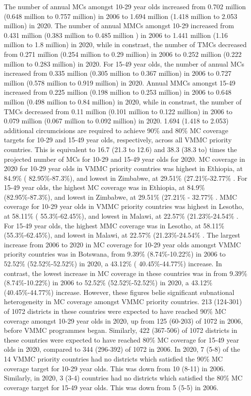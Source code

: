 \documentclass{article}
\begin{document}
The number of annual MCs amongst 10-29 year olds increased from 0.702 million (0.648 million to 0.757
million) in 2006 to 1.694 million (1.418 million to 2.053 million) in 2020.
The number of annual MMCs amongst 10-29 increased from 0.431 million (0.383 million to 0.485 million
) in 2006 to 1.441 million (1.16 million to 1.8 million) in 2020, while in constrast, the number of TMCs
decreased from 0.271 million (0.254 million to 0.29 million) in 2006 to 0.252 million (0.222 million to 0.283
million) in 2020.
For 15-49 year olds, the number of annual MCs increased from 0.335 million (0.305 million to 0.367 million)
in 2006 to 0.727 million (0.578 million to 0.919 million) in 2020.
Annual MMCs amongst 15-49 increased from 0.225 million (0.198 million to 0.253 million) in 2006 to 0.648
million (0.498 million to 0.84 million) in 2020, while in constrast, the number of TMCs decreased from 0.11
million (0.101 million to 0.122 million) in 2006 to 0.079 million (0.067 million to 0.092 million) in 2020.
1.694 (1.418 to 2.053) additional circumcisions are required to achieve 90\% and 80\% MC coverage targets
for 10-29 and 15-49 year olds, respectively, across all VMMC priority countries.
This is equivalent to 16.7 (21.3 to 12.6) and 38.3 (38.3 to) times the projected number of MCs for 10-29
and 15-49 year olds for 2020.
MC coverage in 2020 for 10-29 year olds in VMMC priority countries was highest in Ethiopia, at 84.9\% (
82.95\%-87.3\%), and lowest in Zimbabwe, at 29.51\% (27.21\%-32.77\% . For 15-49 year olds, the highest
MC coverage was in Ethiopia, at 84.9\% (82.95\%-87.3\%), and lowest in Zimbabwe, at 29.51\% (27.21\% -
32.77\% . MMC coverage for 10-29 year olds in VMMC priority countries was highest in Lesotho, at 58.11\% (
55.3\%-62.45\%), and lowest in Malawi, at 22.57\% (21.23\%-24.54\% . For 15-49 year olds, the highest MMC
coverage was in Lesotho, at 58.11\% (55.3\%-62.45\%), and lowest in Malawi, at 22.57\% (21.23\%-24.54\% .
The largest increase from 2006 to 2020 in MC coverage for 10-29 year olds amongst VMMC priority countries
was in Botswana, from 9.39\% (8.74\%-10.22\%) in 2006 to 52.52\% (52.52\%-52.52\%) in 2020, a 43.12\% (
40.45\%-44.77\%) increase. In contrast, the lowest increase in MC coverage in these countries was in from
9.39\% (8.74\%-10.22\%) in 2006 to 52.52\% (52.52\%-52.52\%) in 2020, a 43.12\% (40.45\%-44.77\%)
increase.
However, these figures belie significant subnational heterogeneity in MC coverage amongst VMMC priority
countries. 213 (124-301) of 1072 districts in these countries were expected to have reached 90\% MC
coverage amongst 10-29 year olds in 2020, up from 125 (60-203) of 1072 in 2006, before VMMC programmes
began. Similarly, 422 (367-506) of 1072 districts in these countries were expected to have reached 80\% MC
coverage for 15-49 year olds in 2020, compared to 344 (296-392) of 1072 in 2006.
In 2020, 7 (5-8) of the 14 VMMC priority countries had no districts which satisfied the 90\% MC coverage
target for 10-29 year olds. This was down from 10 (8-11) in 2006. Similarly, in 2020, 3 (3-4) countries had no districts which satisfied the 80\% MC coverage target for 15-49 year olds. This was down from 5 (5-5) in 2006.
\end{document}
